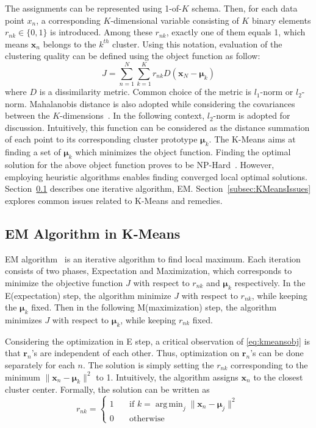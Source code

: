 The assignments can be represented using 1-of-$K$ schema. Then, for each data point $x_n$, a corresponding  $K$-dimensional variable consisting of $K$ binary elements $r_{nk} \in \{0, 1\}$ is introduced. Among these $r_{nk}$, exactly one of them equals 1, which means $\mathbf{x}_{n}$ belongs to the $k^{th}$ cluster. Using this notation, evaluation of the clustering quality can be defined using the object function as follow:
\begin{equation}	
	\label{eq:kmeansobj}
	J = \sum_{n=1}^{N}\sum_{k=1}^{K}r_{nk}D(\mathbf{x}_{N} - \boldsymbol{\mu}_{k})
\end{equation}
where $D$ is a dissimilarity metric. Common choice of the metric is $\mathit{l}_1$-norm or $\mathit{l}_2$-norm. Mahalanobis distance is also adopted while considering the covariances between the $K$-dimensions~\cite{davis1986statistics}. In the following context, $\mathit{l}_2$-norm is adopted for discussion. 
 Intuitively, this function can be considered as the distance summation of each point to its corresponding cluster prototype $\boldsymbol{\mu}_k$. The K-Means aims at finding a set of $\boldsymbol{\mu}_k$ which minimizes the object function. Finding the optimal solution for the above object function proves to be NP-Hard~\cite{aloise2009np}. However, employing heuristic algorithms enables finding converged local optimal solutions. Section~\ref{subsec:EM} describes one iterative algorithm, EM. Section~\ref{subsec:KMeansIssues} explores common issues related to K-Means and remedies.
\subsection{EM Algorithm in K-Means}
\label{subsec:EM}

EM algorithm~\cite{dempster1977maximum} is an iterative algorithm to find local maximum. Each iteration consists of two phases, Expectation and Maximization, which corresponds to minimize the objective function $J$ with respect to $r_{nk}$ and $\boldsymbol{\mu}_{k}$ respectively. In the E(expectation) step, the algorithm minimize $J$ with respect to $r_{nk}$, while keeping the $\boldsymbol{\mu}_{k}$ fixed. Then in the following M(maximization) step, the algorithm minimizes $J$ with respect to $\boldsymbol{\mu}_{k}$, while keeping $r_{nk}$ fixed. 

Considering the optimization in E step, a critical observation of \eqref{eq:kmeansobj} is that \(\mathbf{r}_n\)'s are independent of each other. Thus, optimization on \(\mathbf{r}_n\)'s can be done separately for each \(n\). The solution is simply setting the \(r_{nk}\) corresponding to the minimum \(\| \mathbf{x}_n - \boldsymbol{\mu}_k \|^2\) to 1.  Intuitively, the algorithm assigns \(\mathbf{x}_n\) to the closest cluster center. Formally, the solution can be written as
\begin{equation}
 r_{nk} =
    \begin{cases}
        1   & \quad \text{if } k = \operatorname{arg\,min}_j \parallel \mathbf{x}_{n} - \mathbf{\mu}_{j} {\parallel}^2 \\
        0   & \quad \text{otherwise}
    \end{cases}
\end{equation}

